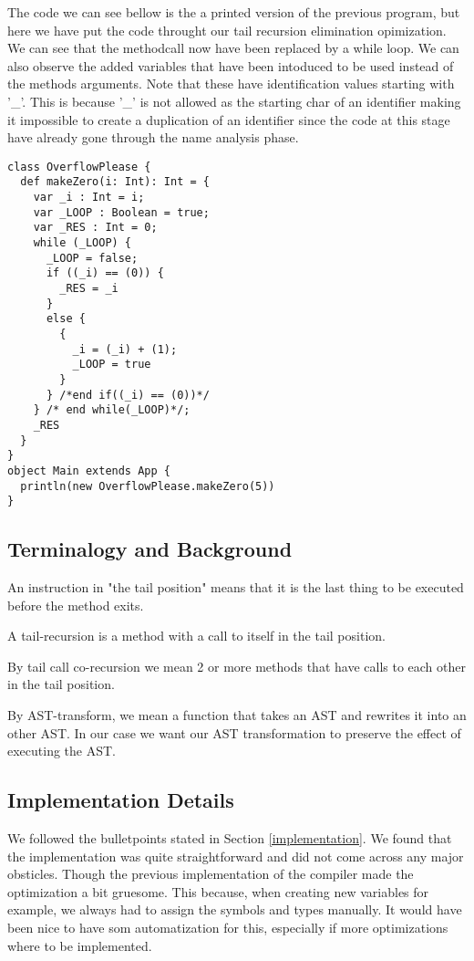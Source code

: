The code we can see bellow is the a printed version of the previous program, but here we have put the code throught our tail recursion elimination opimization. We can see that the methodcall now have been replaced by a while loop. We can also observe the added variables that have been intoduced to be used instead of the methods arguments. Note that these have identification values starting with '\_'. This is because '\_' is not allowed as the starting char of an identifier making it impossible to create a duplication of an identifier since the code at this stage have already gone through the name analysis phase. 
\begin{lstlisting}
class OverflowPlease {
  def makeZero(i: Int): Int = {
    var _i : Int = i;
    var _LOOP : Boolean = true;
    var _RES : Int = 0;
    while (_LOOP) {
      _LOOP = false;
      if ((_i) == (0)) {
        _RES = _i
      }
      else {
        {
          _i = (_i) + (1);
          _LOOP = true
        }
      } /*end if((_i) == (0))*/
    } /* end while(_LOOP)*/;
    _RES
  }
}
object Main extends App {
  println(new OverflowPlease.makeZero(5)) 
}
\end{lstlisting}



\subsection{Terminalogy and Background}
An instruction in "the tail position" means that it is the last thing to be executed before the method exits.

A tail-recursion is a method with a call to itself in the tail position.

By tail call co-recursion we mean 2 or more methods that have calls to each other in the tail position.

By AST-transform, we mean a function that takes an AST and rewrites it into an other AST. In our case we want our AST transformation to preserve the effect of executing the AST.

\subsection{Implementation Details}
\label{sec:details}
We followed the bulletpoints stated in Section \ref{implementation}. We found that the implementation was quite straightforward and did not 
come across any major obsticles. Though the previous implementation of the compiler made the optimization a bit gruesome. This because, when creating
new variables for example, we always had to assign the symbols and types manually. It would have been nice to have som automatization for this, 
especially if more optimizations where to be implemented.
